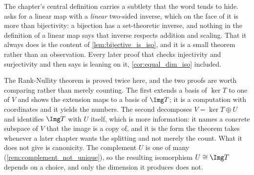 

\begin{ainote}
The chapter's central definition carries a subtlety that the word
 tends to hide.  asks for a linear map
with a \emph{linear} two-sided inverse, which on the face of it is more than
bijectivity: a bijection has a set-theoretic inverse, and nothing in the
definition of a linear map says that inverse respects addition and scaling.
That it always does is the content of \cref{lem:bijective_is_iso}, and it is a
small theorem rather than an observation. Every later proof that checks
injectivity and surjectivity and then says  is leaning on it,
\cref{cor:equal_dim_iso} included.

The Rank-Nullity theorem is proved twice here, and the two proofs are worth
comparing rather than merely counting. The first extends a basis of $\ker T$ to
one of $V$ and shows the extension maps to a basis of $\Img T$; it is a
computation with coordinates and it yields the numbers. The second decomposes
$V = \ker T \oplus U$ and identifies $\Img T$ with $U$ itself, which is more
information: it names a concrete subspace of $V$ that the image is a copy of,
and it is the form the theorem takes whenever a later chapter wants the
splitting and not merely the count. What it does not give is canonicity. The
complement $U$ is one of many (\cref{rem:complement_not_unique}), so the
resulting isomorphism $U \cong \Img T$ depends on a choice, and only the
dimension it produces does not.
\end{ainote}


